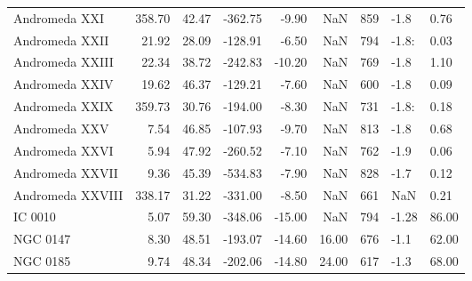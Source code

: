 \begin{longtable}{lrrrrrr}
Andromeda XXI & 358.70 & 42.47 & -362.75 & -9.90 & NaN & 859 & -1.8 & 0.76 \\
Andromeda XXII & 21.92 & 28.09 & -128.91 & -6.50 & NaN & 794 & -1.8: & 0.03 \\
Andromeda XXIII & 22.34 & 38.72 & -242.83 & -10.20 & NaN & 769 & -1.8 & 1.10 \\
Andromeda XXIV & 19.62 & 46.37 & -129.21 & -7.60 & NaN & 600 & -1.8 & 0.09 \\
Andromeda XXIX & 359.73 & 30.76 & -194.00 & -8.30 & NaN & 731 & -1.8: & 0.18 \\
Andromeda XXV & 7.54 & 46.85 & -107.93 & -9.70 & NaN & 813 & -1.8 & 0.68 \\
Andromeda XXVI & 5.94 & 47.92 & -260.52 & -7.10 & NaN & 762 & -1.9 & 0.06 \\
Andromeda XXVII & 9.36 & 45.39 & -534.83 & -7.90 & NaN & 828 & -1.7 & 0.12 \\
Andromeda XXVIII & 338.17 & 31.22 & -331.00 & -8.50 & NaN & 661 & NaN & 0.21 \\
IC 0010 & 5.07 & 59.30 & -348.06 & -15.00 & NaN & 794 & -1.28 & 86.00 \\
NGC 0147 & 8.30 & 48.51 & -193.07 & -14.60 & 16.00 & 676 & -1.1 & 62.00 \\
NGC 0185 & 9.74 & 48.34 & -202.06 & -14.80 & 24.00 & 617 & -1.3 & 68.00 \\
\end{longtable}
